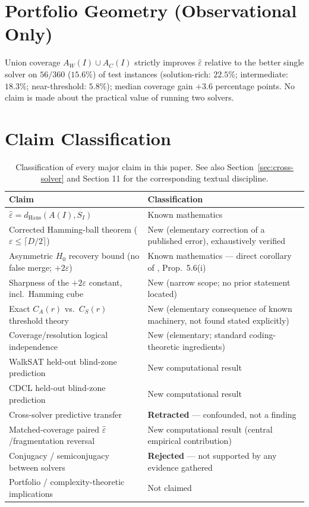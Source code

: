 \documentclass[11pt]{article}
\theoremstyle{definition}
\theoremstyle{remark}
\newcommand{\Shat}{S_I}
\newcommand{\Ahat}[1]{A(#1)}
\newcommand{\dHaus}{d_{\mathrm{Haus}}}
\newcommand{\epshat}{\hat\varepsilon}
\begin{document}
\section{Portfolio Geometry (Observational Only)}
\label{app:portfolio}

Union coverage $A_W(I) \cup A_C(I)$ strictly improves $\epshat$ relative to the better single solver on $56/360$ ($15.6\%$) of test instances (solution-rich: $22.5\%$; intermediate: $18.3\%$; near-threshold: $5.8\%$); median coverage gain $+3.6$ percentage points. No claim is made about the practical value of running two solvers.

\section{Claim Classification}
\label{app:claims}

\begin{table}[htbp]
\centering
\caption{Classification of every major claim in this paper. See also Section~\ref{sec:cross-solver} and Section 11 for the corresponding textual discipline.}
\label{tab:claims}
\footnotesize
\begin{tabular}{@{}p{6.2cm}p{6.2cm}@{}}
\toprule
Claim & Classification \\
\midrule
$\epshat = \dHaus(\Ahat{I},\Shat)$ & Known mathematics \\
Corrected Hamming-ball theorem ($\varepsilon \le \lceil D/2\rceil$) & New (elementary correction of a published error), exhaustively verified \\
Asymmetric $H_0$ recovery bound (no false merge; $+2\varepsilon$) & Known mathematics --- direct corollary of \citet{harker2019comparison}, Prop.\ 5.6(i) \\
Sharpness of the $+2\varepsilon$ constant, incl.\ Hamming cube & New (narrow scope; no prior statement located) \\
Exact $C_A(r)$ vs.\ $C_S(r)$ threshold theory & New (elementary consequence of known machinery, not found stated explicitly) \\
Coverage/resolution logical independence & New (elementary; standard coding-theoretic ingredients) \\
WalkSAT held-out blind-zone prediction & New computational result \\
CDCL held-out blind-zone prediction & New computational result \\
Cross-solver predictive transfer & \textbf{Retracted} --- confounded, not a finding \\
Matched-coverage paired $\epshat$/fragmentation reversal & New computational result (central empirical contribution) \\
Conjugacy / semiconjugacy between solvers & \textbf{Rejected} --- not supported by any evidence gathered \\
Portfolio / complexity-theoretic implications & Not claimed \\
\bottomrule
\end{tabular}
\end{table}



\end{document}
